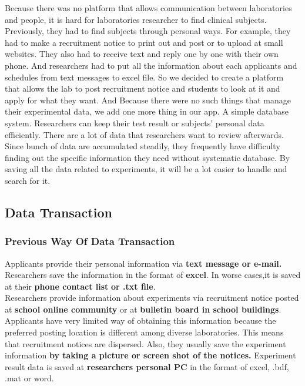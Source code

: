 \documentclass[letterpaper, 10 pt, conference]{ieeeconf}  %
\begin{document}
Because there was no platform that allows communication between laboratories and people, it is hard for laboratories researcher to find clinical subjects. Previously, they had to find subjects through personal ways. For example, they had to make a recruitment notice to print out and post or to upload at small websites. They also had to receive text and reply one by one with their own phone. And researchers had to put all the information about each applicants and schedules from text messages to excel file. So we decided to create a platform that allows the lab to post recruitment notice and students to look at it and apply for what they want. And Because there were no such things that manage their experimental data, we add one more thing in our app. A simple database system. Researchers can keep their test result or subjects’ personal data efficiently. There are a lot of data that researchers want to review afterwards. Since bunch of data are accumulated steadily, they frequently have difficulty finding out the specific information they need without systematic database. By saving all the data related to experiments, it will be a lot easier to handle and search for it. \\

\subsection{Data Transaction\\}

\subsubsection{Previous Way Of Data Transaction}
Applicants provide their personal information via \textbf{text message or e-mail.} 
Researchers save the information in the format of \textbf{excel}. In worse cases,it is saved at their \textbf{phone contact list}\textbf{ or .txt file}.\\
Researchers provide information about experiments via recruitment notice posted at \textbf{school online community} or at \textbf{bulletin board in school buildings}. Applicants have very limited way of obtaining this information because the preferred posting location is different among diverse laboratories. This means that recruitment notices are dispersed. Also, they usually save the experiment information \textbf{by taking a picture or screen shot of the notices.}
Experiment result data is saved at \textbf{researchers personal PC} in the format of excel, .bdf, .mat or word.\\
\end{document}
